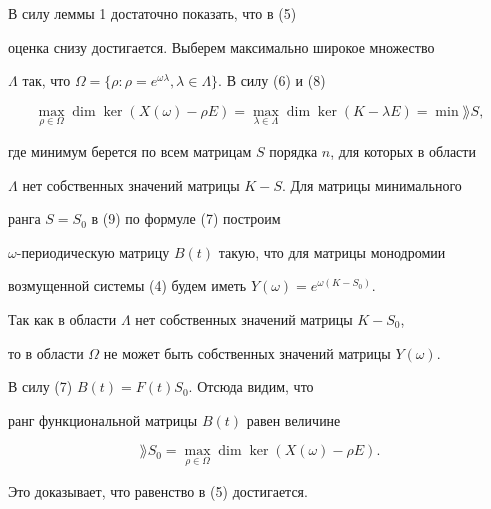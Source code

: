\begin{pf} В силу леммы 1 достаточно показать, что в (5)


оценка снизу достигается. Выберем максимально широкое множество


$\Lambda$ так, что $\Omega=\{\rho: \rho=e^{\omega\lambda},


\lambda\in\Lambda\}$. В силу (6) и (8)


\begin{equation}


\max_{\rho\in\Omega}\dim\ker(X(\omega)-\rho E)=


\max_{\lambda\in\Lambda}\dim\ker(K-\lambda E)=\min\rang S,


\end{equation}


где минимум берется по всем матрицам $S$ порядка $n$, для которых в области


$\Lambda$ нет собственных значений матрицы $K-S$. Для матрицы минимального


ранга $S=S_0$ в (9) по формуле (7) построим


$\omega$-периодическую матрицу $B(t)$ такую, что для матрицы монодромии


возмущенной системы (4) будем иметь $Y(\omega)=e^{\omega(K-S_0)}$.


Так как в области $\Lambda$ нет собственных значений матрицы $K-S_0$,


то в области $\Omega$ не может быть собственных значений матрицы $Y(\omega)$.


В силу (7) $B(t)=F(t)S_0$. Отсюда видим, что


ранг функциональной матрицы $B(t)$ равен величине


$$


\rang S_0=\max_{\rho\in\Omega}\dim\ker(X(\omega)-\rho E).


$$


Это доказывает, что равенство в (5) достигается.


\end{pf}





